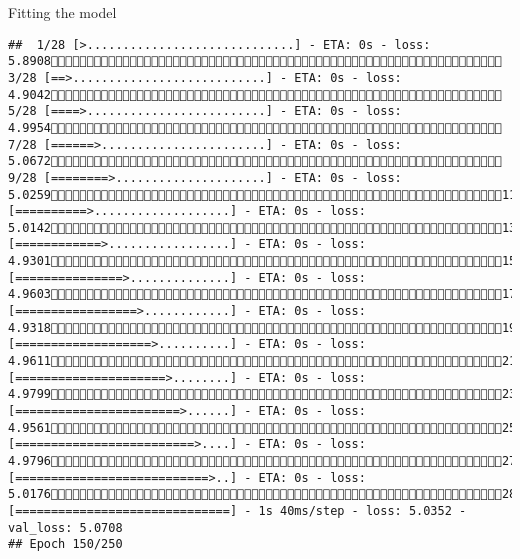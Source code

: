 \documentclass[
  ignorenonframetext,
]{beamer}
\begin{document}
\begin{frame}[fragile]{Fitting the model}
\begin{verbatim}
##  1/28 [>.............................] - ETA: 0s - loss: 5.8908 3/28 [==>...........................] - ETA: 0s - loss: 4.9042 5/28 [====>.........................] - ETA: 0s - loss: 4.9954 7/28 [======>.......................] - ETA: 0s - loss: 5.0672 9/28 [========>.....................] - ETA: 0s - loss: 5.025911/28 [==========>...................] - ETA: 0s - loss: 5.014213/28 [============>.................] - ETA: 0s - loss: 4.930115/28 [===============>..............] - ETA: 0s - loss: 4.960317/28 [=================>............] - ETA: 0s - loss: 4.931819/28 [===================>..........] - ETA: 0s - loss: 4.961121/28 [=====================>........] - ETA: 0s - loss: 4.979923/28 [=======================>......] - ETA: 0s - loss: 4.956125/28 [=========================>....] - ETA: 0s - loss: 4.979627/28 [===========================>..] - ETA: 0s - loss: 5.017628/28 [==============================] - 1s 40ms/step - loss: 5.0352 - val_loss: 5.0708
## Epoch 150/250

\end{verbatim}
\end{frame}
\end{document}
